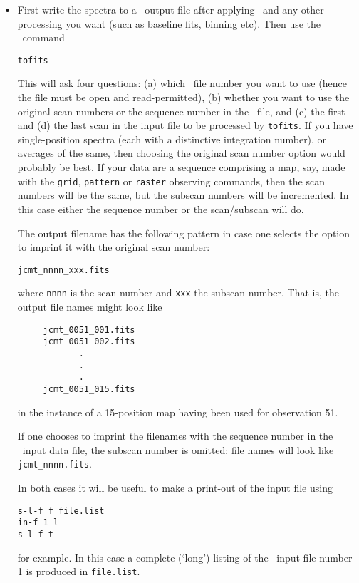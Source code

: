 \begin{itemize}
\item
First write the spectra to a \SPECX\ output file after applying \dm\
and any other processing you want (such as baseline fits, binning
etc). Then use the
\SPECX\ command 

\SP \verb|tofits|

This will ask four questions: (a) which \SPECX\ file number you want
to use (hence the file must be open and read-permitted), (b) whether
you want to use the original scan numbers or the sequence number in
the \SPECX\ file, and (c) the first and (d) the last scan in the input
file to be processed by {\tt tofits}. If you have single-position
spectra (each with a distinctive integration number), or averages of
the same, then choosing the original scan number option would
probably be best. If your data are a sequence comprising a map, say, made with
the {\tt grid}, {\tt pattern} or {\tt raster} observing commands, then
the scan numbers will be the same, but the subscan numbers will be
incremented. In this case either the sequence number or the
scan/subscan will do.

The output filename has the following pattern in case one selects the
option to imprint it with the original scan number:

\verb|jcmt_nnnn_xxx.fits|

where {\tt nnnn} is the scan number and {\tt xxx} the subscan
number. That is, the output file names might look like
\begin{verbatim}
     jcmt_0051_001.fits
     jcmt_0051_002.fits
            .
            .
            .
     jcmt_0051_015.fits
\end{verbatim}
in the instance of a 15-position map having been used for observation
51.

If one chooses to imprint the filenames with the sequence number in
the \SPECX\ input data file, the subscan number is omitted: file names
will look like
\verb|jcmt_nnnn.fits|. 

In both cases it will be useful to make a print-out of the input file
using

\SP \verb|s-l-f f file.list|\\
\SP \verb|in-f 1 l|\\
\SP \verb|s-l-f t|

for example. In this case a complete (`long') listing of the \SPECX\
input file number 1 is produced in {\tt file.list}.


\end{itemize}
